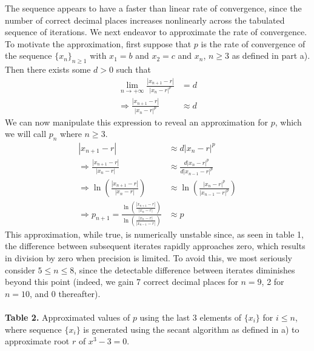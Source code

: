 \documentclass[11pt, letterpaper]{article}
\begin{document}
The sequence appears to have a faster than linear rate of convergence, since the number of correct
decimal places increases nonlinearly across the tabulated sequence of iterations. We next endeavor to 
approximate the rate of convergence.
To motivate the approximation, first suppose that $p$ is the rate of convergence of the sequence $\{x_n\}_{n\geq 1}$ with $x_1=b$ and
$x_2=c$ and $x_n$, $n\geq 3$ as defined in part a). Then there exists some $d>0$ such that
\begin{align*}
    \lim_{n \to +\infty} \frac{|x_{n+1}-r|}{|x_n-r|^p}&=d\\
    \Rightarrow\frac{|x_{n+1}-r|}{|x_n-r|^p}&\approx d
\end{align*}
We can now manipulate this expression to reveal an approximation for $p$, which we will call $p_n$ where $n\geq 3$.
\begin{align*}
    |x_{n+1}-r|&\approx d|x_n-r|^p\\
    \Rightarrow\frac{|x_{n+1}-r|}{|x_n-r|}&\approx \frac{d|x_n-r|^p}{d|x_{n-1}-r|^p}\\
    \Rightarrow\ln\left(\frac{|x_{n+1}-r|}{|x_n-r|}\right)&\approx \ln\left(\frac{|x_n-r|^p}{|x_{n-1}-r|^p}\right)\\
    \Rightarrow p_{n+1}=\frac{\ln\left(\frac{|x_{n+1}-r|}{|x_n-r|}\right)}{\ln\left(\frac{|x_n-r|}{|x_{n-1}-r|}\right)}&\approx p
\end{align*}
This approximation, while true, is numerically unstable since, as seen in table 1, the difference between
subsequent iterates rapidly approaches zero, which results in division by zero when precision is limited. To avoid this, we most seriously consider
$5\leq n \leq 8$, since the detectable difference between iterates diminishes beyond this point (indeed, we gain
7 correct decimal places for $n=9$, 2 for $n=10$, and 0 thereafter). \\\\
{\bf Table 2.} 
Approximated values of $p$ using the last 3 elements of $\{x_i\}$ for $i\leq n$, where sequence $\{x_i\}$ is
generated using the secant algorithm as defined in a) to approximate root $r$ of $x^3-3=0$.  
\end{document}
